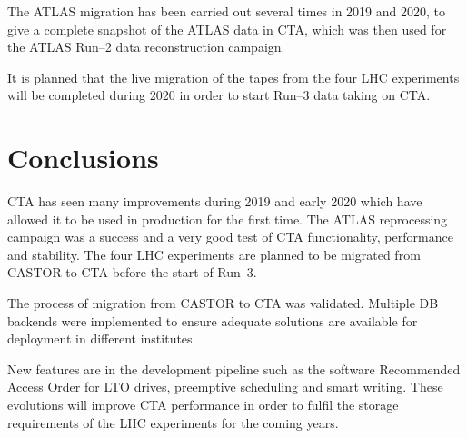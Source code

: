 \documentclass{webofc}
\begin{document}
The ATLAS migration has been carried out several times in 2019 and 2020, to give a complete snapshot of the ATLAS data in CTA,
which was then used for the ATLAS Run--2 data reconstruction campaign.

It is planned that the live migration of the tapes from the four LHC experiments will be completed during 2020 in order to start Run--3
data taking on CTA.

\section{Conclusions}

CTA has seen many improvements during 2019 and early 2020 which have allowed it to be used in production for the first time.  The ATLAS reprocessing campaign was a success and a very good test of CTA functionality, performance and stability.
The four LHC experiments are planned to be migrated from CASTOR to CTA before the start of Run--3.

The process of migration from CASTOR to CTA was validated. Multiple DB backends were implemented to ensure adequate solutions are available for deployment in different institutes. 

New features are in the development pipeline such as the software Recommended Access Order for LTO drives, preemptive scheduling and smart writing. These evolutions will improve CTA performance in order to fulfil the storage requirements of the LHC experiments for the coming years.

%
%

\end{document}
